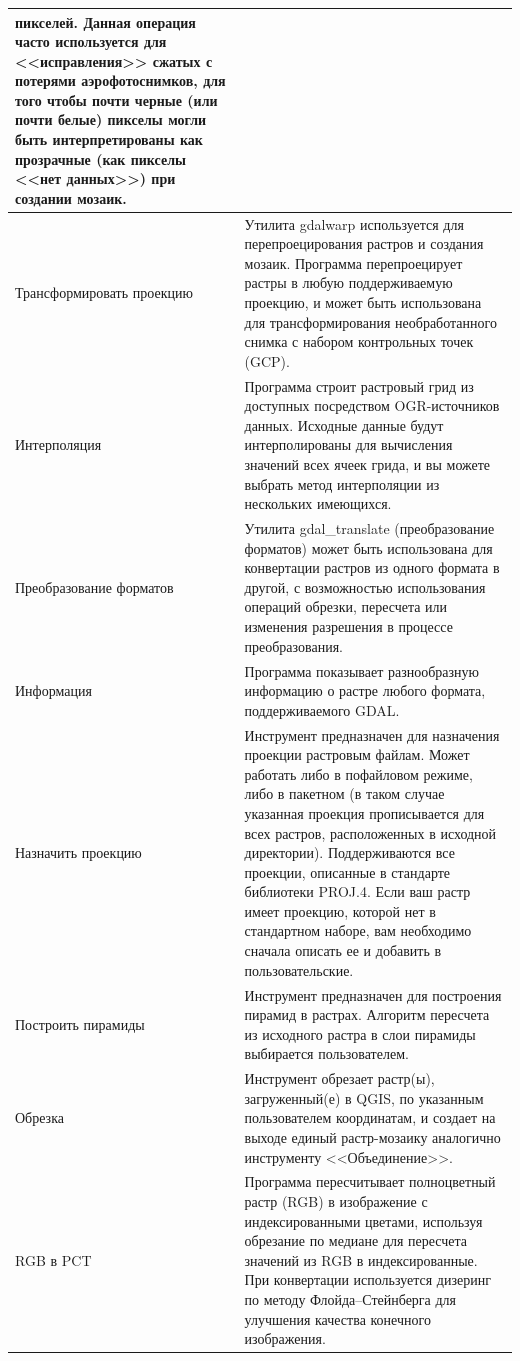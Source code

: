 {\begin{longtable}{|p{3cm}|p{13cm}|}
 пикселей. Данная операция часто используется для <<исправления>> сжатых с
 потерями аэрофотоснимков, для того чтобы почти черные (или почти белые)
 пикселы могли быть интерпретированы как прозрачные (как пикселы <<нет данных>>)
 при создании мозаик.\\
\hline Трансформировать проекцию & Утилита gdalwarp используется для
 перепроецирования растров и создания мозаик. Программа перепроецирует растры
 в любую поддерживаемую проекцию, и может быть использована для трансформирования
 необработанного снимка с набором контрольных точек (GCP). \\
\hline Интерполяция & Программа строит растровый грид из доступных посредством
 OGR-источников данных. Исходные данные будут интерполированы для вычисления
 значений всех ячеек грида, и вы можете выбрать метод интерполяции из нескольких
 имеющихся.\\
\hline Преобразование форматов & Утилита gdal\_translate (преобразование
 форматов) может быть использована для конвертации растров из одного формата в
 другой, с возможностью использования операций обрезки, пересчета или изменения
 разрешения в процессе преобразования.\\
\hline Информация & Программа показывает разнообразную информацию о растре
 любого формата, поддерживаемого GDAL. \\
\hline Назначить проекцию &  Инструмент предназначен для назначения проекции
 растровым файлам. Может работать либо в пофайловом режиме, либо в пакетном (в таком
 случае указанная проекция прописывается для всех растров, расположенных в
 исходной директории). Поддерживаются все проекции, описанные в
 стандарте библиотеки PROJ.4. Если ваш растр имеет проекцию, которой нет в стандартном наборе, вам
 необходимо сначала описать ее и добавить в пользовательские. \\
\hline Построить пирамиды &  Инструмент предназначен для построения пирамид в
 растрах. Алгоритм пересчета из исходного растра в слои пирамиды выбирается
 пользователем.\\
\hline Обрезка & Инструмент обрезает растр(ы), загруженный(е) в QGIS, по
 указанным пользователем координатам, и создает на выходе единый растр-мозаику
 аналогично инструменту <<Объединение>>. \\
\hline RGB в PCT &  Программа пересчитывает полноцветный растр (RGB) в изображение
 с индексированными цветами, используя обрезание по медиане для пересчета значений
 из RGB в индексированные. При конвертации используется дизеринг по методу Флойда--Стейнберга
 для улучшения качества конечного изображения. \\

\end{longtable}}
